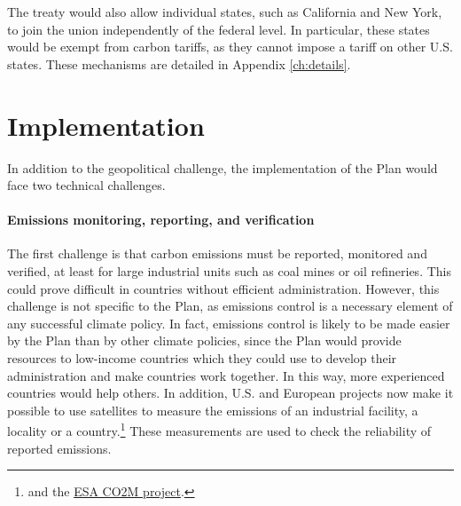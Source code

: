 \documentclass[a5paper,english,openany]{memoir}
\begin{document}
The treaty would also allow individual %
states, %
such as California and New York, %
to join the union independently of the federal level. In particular, these states would be exempt from carbon tariffs, %
as they cannot impose a tariff on other U.S. states. 
These mechanisms are detailed in Appendix \ref{ch:details}. 


\section{Implementation}\label{sec:implementation}
In addition to the geopolitical challenge, the implementation of the Plan would face two technical challenges. 

\paragraph{Emissions monitoring, reporting, and verification}

The first challenge is that carbon emissions must be reported, monitored and verified, at least %
for large industrial units such as coal mines or oil refineries. This could prove difficult in countries without %
efficient administration. However, this challenge is not specific to the Plan, as emissions control is a necessary element of any successful climate policy. In fact, emissions control is likely to be made easier by the Plan than by other climate policies, since the Plan would provide resources to low-income countries which they could use to develop their administration %
and make %
countries work together. %
In this way, more experienced countries would help others. In addition, U.S. and European projects now make it possible to use satellites to measure the emissions of an industrial facility, a locality or a country.\footnote{\citet{pan_potential_2021,shen_national_2023} and the \href{https://www.esa.int/Applications/Observing_the_Earth/Copernicus/Carbon_dioxide_monitoring_satellite_given_the_shakes}{ESA CO2M project}.} These measurements are used to check the reliability of reported emissions.
\end{document}
